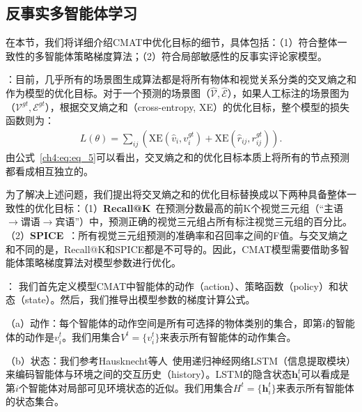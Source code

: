 \subsection{反事实多智能体学习}

在本节，我们将详细介绍CMAT中优化目标的细节，具体包括：（1）符合整体一致性的多智能体策略梯度算法；（2）符合局部敏感性的反事实评论家模型。


\textbf{}：目前，几乎所有的场景图生成算法都是将所有物体和视觉关系分类的交叉熵之和作为模型的优化目标。对于一个预测的场景图（$\hat{\mathcal{V}}, \hat{\mathcal{E}}$），如果人工标注的场景图为（$\mathcal{V}^{gt}, \mathcal{E}^{gt}$），根据交叉熵之和（cross-entropy, XE）的优化目标，整个模型的损失函数则为：
\begin{equation} \label{ch4:eq:eq_5}
\begin{aligned}
   L(\theta) =  \textstyle{\sum_{ij}} \left(\text{XE}(\hat{v}_i, v^{gt}_i) + \text{XE}(\hat{r}_{ij}, r^{gt}_{ij}) \right). 
\end{aligned}
\end{equation}
由公式~\eqref{ch4:eq:eq_5}可以看出，交叉熵之和的优化目标本质上将所有的节点预测都看成相互独立的。

为了解决上述问题，我们提出将交叉熵之和的优化目标替换成以下两种具备整体一致性的优化目标：（1）\textbf{Recall@K}~\cite{lu2016visual}在预测分数最高的前K个视觉三元组（“主语$\to$谓语$\to$宾语”）中，预测正确的视觉三元组占所有标注视觉三元组的百分比。（2）\textbf{SPICE}~\cite{anderson2016spice}：所有视觉三元组预测的准确率和召回率之间的F值。与交叉熵之和不同的是，Recall@K和SPICE都是不可导的。因此，CMAT模型需要借助多智能体策略梯度算法对模型参数进行优化。


\textbf{}：
我们首先定义模型CMAT中智能体的动作（action）、策略函数（policy）和状态（state）。然后，我们推导出模型参数的梯度计算公式。

（a）动作：每个智能体的动作空间是所有可选择的物体类别的集合，即第$i$的智能体的动作是$v^t_i$。我们用集合$V^t = \{v^t_i\}$来表示所有智能体的动作集合。

（b）状态：我们参考Hausknecht等人~\cite{hausknecht2015deep}使用递归神经网络LSTM（信息提取模块）来编码智能体与环境之间的交互历史（history）。LSTM的隐含状态$\bm{h}^t_i$可以看成是第$i$个智能体对局部可见环境状态的近似。我们用集合$H^t = \{\bm{h}^t_i\}$来表示所有智能体的状态集合。

